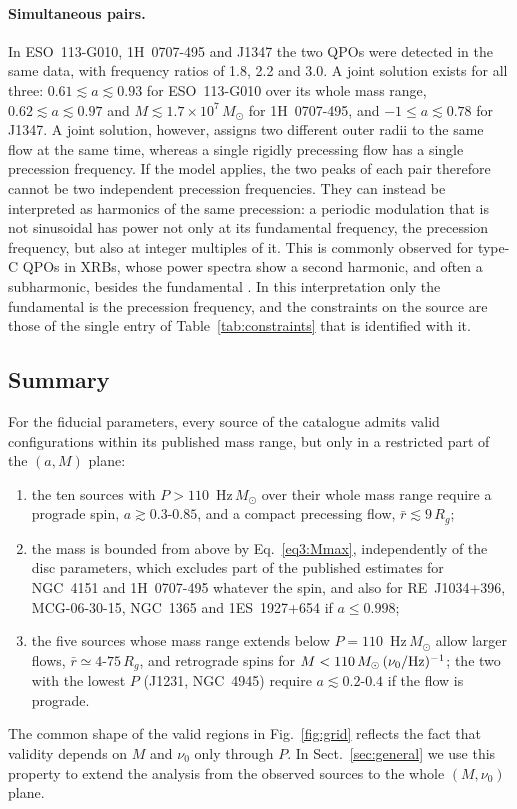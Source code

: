 \paragraph{Simultaneous pairs.}
In ESO~113-G010, 1H~0707-495 and J1347 the two QPOs were detected in the same data, with frequency ratios of 1.8, 2.2 and 3.0.
A joint solution exists for all three: $0.61\lesssim a\lesssim0.93$ for ESO~113-G010 over its whole mass range, $0.62\lesssim a\lesssim0.97$ and $M\lesssim1.7\times10^7\,M_\odot$ for 1H~0707-495, and $-1\leq a\lesssim0.78$ for J1347.
A joint solution, however, assigns two different outer radii to the same flow at the same time, whereas a single rigidly precessing flow has a single precession frequency.
If the model applies, the two peaks of each pair therefore cannot be two independent precession frequencies.
They can instead be interpreted as harmonics of the same precession: a periodic modulation that is not sinusoidal has power not only at its fundamental frequency, the precession frequency, but also at integer multiples of it.
This is commonly observed for type-C QPOs in XRBs, whose power spectra show a second harmonic, and often a subharmonic, besides the fundamental \citep{ingram}.
In this interpretation only the fundamental is the precession frequency, and the constraints on the source are those of the single entry of Table~\ref{tab:constraints} that is identified with it.

\subsection{Summary}
\label{sec3:summary}

For the fiducial parameters, every source of the catalogue admits valid configurations within its published mass range, but only in a restricted part of the $(a,M)$ plane:
\begin{enumerate}[I]
    \item the ten sources with $P>110$~Hz\,$M_\odot$ over their whole mass range require a prograde spin, $a\gtrsim0.3$-$0.85$, and a compact precessing flow, $\bar r\lesssim9\,R_g$;
    \item the mass is bounded from above by Eq.~\eqref{eq3:Mmax}, independently of the disc parameters, which excludes part of the published estimates for NGC~4151 and 1H~0707-495 whatever the spin, and also for RE~J1034+396, MCG-06-30-15, NGC~1365 and 1ES~1927+654 if $a\leq0.998$;
    \item the five sources whose mass range extends below $P=110$~Hz\,$M_\odot$ allow larger flows, $\bar r\simeq4$-$75\,R_g$, and retrograde spins for $M<110\,M_\odot\,(\nu_0/\textup{Hz})^{-1}$; the two with the lowest $P$ (J1231, NGC~4945) require $a\lesssim0.2$-$0.4$ if the flow is prograde.
\end{enumerate}
The common shape of the valid regions in Fig.~\ref{fig:grid} reflects the fact that validity depends on $M$ and $\nu_0$ only through $P$.
In Sect.~\ref{sec:general} we use this property to extend the analysis from the observed sources to the whole $(M,\nu_0)$ plane.